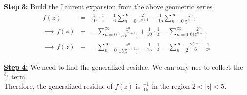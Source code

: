 \documentclass[11pt]{report}
\newcommand{\ubt}[1]{\textbf{\underline{#1}}}
\newcommand{\sps}{\\[0.2cm]}
\newcommand{\dsp}{\displaystyle}
\newcommand{\NI}{\noindent}
\begin{document}
	\NI\ubt{Step 3:} Build the Laurent expansion from the above geometric series
	\begin{eqnarray*}
		f(z) &=& \frac{1}{10}\cdot \frac{1}{z} - \frac{1}{6}\sum_{n=0}^{\infty}\frac{2^n}{z^{n+1}} - \frac{1}{15}\sum_{n=0}^{\infty}\frac{z^n}{5^{n+1}}\sps
		\implies f(z) &=& - \sum_{n=0}^{\infty}\frac{z^n}{15\big(5^{n+1}\big)} + \frac{1}{10}\cdot\frac{1}{z} - \sum_{n=0}^{\infty}\frac{2^n}{6\big(z^{n+1}\big)}\sps
		\implies f(z) &=& -\sum_{n=0}^{\infty}\frac{z^n}{15\big(5^{n+1}\big)} - \frac{1}{15}\cdot\frac{1}{z} - \sum_{n=2}^{\infty}\frac{2^{n-1}}{6}\cdot \frac{1}{z^n}
	\end{eqnarray*}
	
	\NI\ubt{Step 4:} We need to find the generalized residue. We can only nee to collect the $\dsp\frac{b_1}{z}$ term.\\
	Therefore, the generalized residue of $f(z)$ is $\dsp\frac{-1}{15}$ in the region $2<|z|<5$.
	
\end{document}
